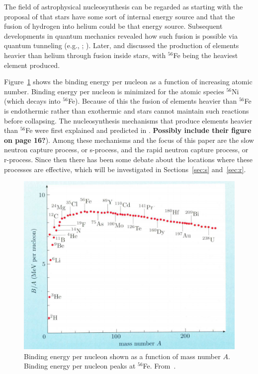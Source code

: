 The field of astrophysical nucleosynthesis can be regarded as starting with the proposal of \cite{eddington1920} that stars have some sort of internal energy source and that the fusion of hydrogen into helium could be that energy source.  Subsequent developments in quantum mechanics revealed how such fusion is possible via quantum tunneling (e.g., \citealt{gurneycondon1928}; \citealt{atkinson1929}). Later, \cite{hoyle1946} and \cite{hoyle1954} discussed the production of elements heavier than helium through fusion inside stars, with $^{56}$Fe being the heaviest element produced.

Figure~\ref{fig:be} shows the binding energy per nucleon as a function of increasing atomic number.  Binding energy per nucleon is minimized for the atomic species $^{56}$Ni (which decays into $^{56}$Fe).  Because of this the fusion of elements heavier than $^{56}$Fe is endothermic rather than exothermic and stars cannot maintain such reactions before collapsing.  The nucleosynthesis mechanisms that produce elements heavier than $^{56}$Fe were first explained and predicted in \cite{burbidge1957}.  {\bf Possibly include their figure on page 16?}).  Among these mechanisms and the focus of this paper are the slow neutron capture process, or s-process, and the rapid neutron capture process, or r-process.  
Since then there has been some debate about the locations where these processes are effective, which will be investigated in Sections~\ref{sec:s} and~\ref{sec:r}.

\begin{figure}
\includegraphics[width=\linewidth]{pdf/bindingenergy.png}
\caption{\label{fig:be}Binding energy per nucleon shown as a function of mass number $A$.  Binding energy per nucleon peaks at $^{56}$Fe.  From~\cite{ryan2010}.}
\end{figure}

